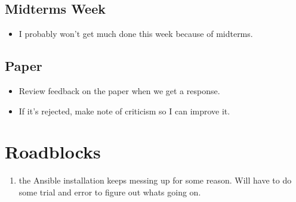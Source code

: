 \documentclass[paper=a4, fontsize=12pt]{scrartcl} %
\numberwithin{equation}{section} %
\numberwithin{figure}{section} %
\numberwithin{table}{section} %
\begin{document}
\subsection{Midterms Week}
\begin{itemize}
	\item I probably won't get much done this week because of midterms.
\end{itemize}

\subsection{Paper}
\begin{itemize}
	\item Review feedback on the paper when we get a response.
	\item If it's rejected, make note of criticism so I can improve it. 
\end{itemize}





\section{Roadblocks}
\begin{enumerate}
	\item  the Ansible installation keeps messing up for some reason. Will have to do some trial and error to figure out whats going on.
\end{enumerate}
\end{document}
